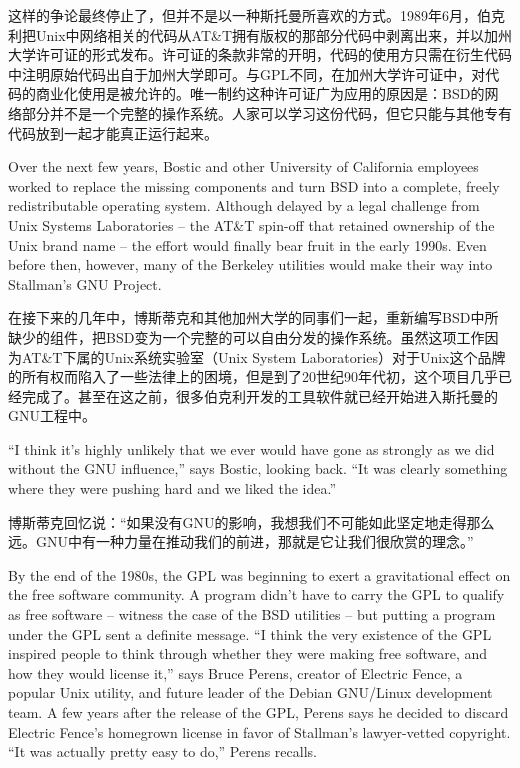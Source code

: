 \ifdefined\chs
这样的争论最终停止了，但并不是以一种斯托曼所喜欢的方式。1989年6月，伯克利把Unix中网络相关的代码从AT\&T拥有版权的那部分代码中剥离出来，并以加州大学许可证的形式发布。许可证的条款非常的开明，代码的使用方只需在衍生代码中注明原始代码出自于加州大学即可。与GPL不同，在加州大学许可证中，对代码的商业化使用是被允许的。唯一制约这种许可证广为应用的原因是：BSD的网络部分并不是一个完整的操作系统。人家可以学习这份代码，但它只能与其他专有代码放到一起才能真正运行起来。
\fi

\ifdefined\eng
Over the next few years, Bostic and other University of California employees worked to replace the missing components and turn BSD into a complete, freely redistributable operating system. Although delayed by a legal challenge from Unix Systems Laboratories -- the AT\&T spin-off that retained ownership of the Unix brand name -- the effort would finally bear fruit in the early 1990s. Even before then, however, many of the Berkeley utilities would make their way into Stallman's GNU Project.
\fi

\ifdefined\chs
在接下来的几年中，博斯蒂克和其他加州大学的同事们一起，重新编写BSD中所缺少的组件，把BSD变为一个完整的可以自由分发的操作系统。虽然这项工作因为AT\&T下属的Unix系统实验室（Unix System Laboratories）对于Unix这个品牌的所有权而陷入了一些法律上的困境，但是到了20世纪90年代初，这个项目几乎已经完成了。甚至在这之前，很多伯克利开发的工具软件就已经开始进入斯托曼的GNU工程中。
\fi

\ifdefined\eng
``I think it's highly unlikely that we ever would have gone as strongly as we did without the GNU influence,'' says Bostic, looking back. ``It was clearly something where they were pushing hard and we liked the idea.''
\fi

\ifdefined\chs
博斯蒂克回忆说：``如果没有GNU的影响，我想我们不可能如此坚定地走得那么远。GNU中有一种力量在推动我们的前进，那就是它让我们很欣赏的理念。''
\fi

\ifdefined\eng
By the end of the 1980s, the GPL was beginning to exert a gravitational effect on the free software community. A program didn't have to carry the GPL to qualify as free software -- witness the case of the BSD utilities -- but putting a program under the GPL sent a definite message. ``I think the very existence of the GPL inspired people to think through whether they were making free software, and how they would license it,'' says Bruce Perens, creator of Electric Fence, a popular Unix utility, and future leader of the Debian GNU/Linux development team. A few years after the release of the GPL, Perens says he decided to discard Electric Fence's homegrown license in favor of Stallman's lawyer-vetted copyright. ``It was actually pretty easy to do,'' Perens recalls.
\fi

